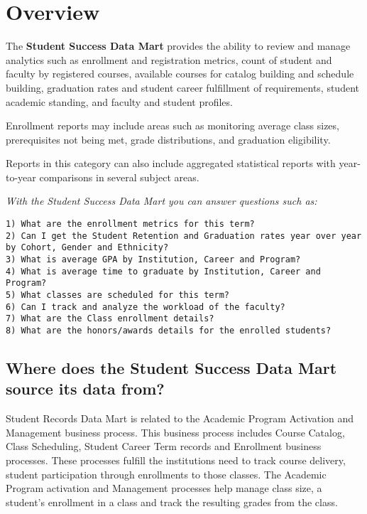 \documentclass[
]{book}
\begin{document}
\hypertarget{overview}{%
\chapter{Overview}\label{overview}}

The \textbf{Student Success Data Mart} provides the ability to review and manage analytics such as enrollment and registration metrics, count of student and faculty by registered courses, available courses for catalog building and schedule building, graduation rates and student career fulfillment of requirements, student academic standing, and faculty and student profiles.

Enrollment reports may include areas such as monitoring average class sizes, prerequisites not being met, grade distributions, and graduation eligibility.

Reports in this category can also include aggregated statistical reports with year-to-year comparisons in several subject areas.

\emph{With the Student Success Data Mart you can answer questions such as:}

\begin{verbatim}
1) What are the enrollment metrics for this term?
2) Can I get the Student Retention and Graduation rates year over year by Cohort, Gender and Ethnicity?
3) What is average GPA by Institution, Career and Program?
4) What is average time to graduate by Institution, Career and Program?
5) What classes are scheduled for this term?
6) Can I track and analyze the workload of the faculty?
7) What are the Class enrollment details?
8) What are the honors/awards details for the enrolled students?
\end{verbatim}

\hypertarget{where-does-the-student-success-data-mart-source-its-data-from}{%
\section{Where does the Student Success Data Mart source its data from?}\label{where-does-the-student-success-data-mart-source-its-data-from}}

Student Records Data Mart is related to the Academic Program Activation and Management business process. This business process includes Course Catalog, Class Scheduling, Student Career Term records and Enrollment business processes. These processes fulfill the institutions need to track course delivery, student participation through enrollments to those classes. The Academic Program activation and Management processes help manage class size, a student's enrollment in a class and track the resulting grades from the class.
\end{document}
